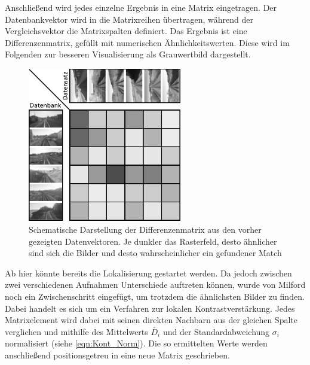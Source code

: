 \documentclass[12pt,a4paper,titlepage]{scrartcl}
\begin{document}
Anschließend wird jedes einzelne Ergebnis in eine Matrix eingetragen. Der Datenbankvektor wird in die Matrixreihen übertragen, während der Vergleichsvektor die Matrixspalten definiert. Das Ergebnis ist eine Differenzenmatrix, gefüllt mit numerischen Ähnlichkeitswerten. Diese wird im Folgenden zur besseren Visualisierung als Grauwertbild dargestellt.

\begin{figure}[!h]
	\centering
	\includegraphics[width=0.6\textwidth]{../Bilder/Differenzenmatrix.pdf}
	\caption[Schematische Darstellung der Differenzenmatrix]{Schematische Darstellung der Differenzenmatrix aus den vorher gezeigten Datenvektoren. Je dunkler das Rasterfeld, desto ähnlicher sind sich die Bilder und desto wahrscheinlicher ein gefundener Match}
	\label{img:dif_Mat}
\end{figure}

Ab hier könnte bereits die Lokalisierung gestartet werden. Da jedoch zwischen zwei verschiedenen Aufnahmen Unterschiede auftreten können, wurde von Milford noch ein Zwischenschritt eingefügt, um trotzdem die ähnlichsten Bilder zu finden. Dabei handelt es sich um ein Verfahren zur lokalen Kontrastverstärkung. Jedes Matrixelement wird dabei mit seinen direkten Nachbarn aus der gleichen Spalte verglichen und mithilfe des Mittelwerts $\overline{D}_i$ und der Standardabweichung $\sigma_i$ normalisiert (siehe \autoref{eqn:Kont_Norm}). Die so ermittelten Werte werden anschließend positionsgetreu in eine neue Matrix geschrieben. 
\end{document}
